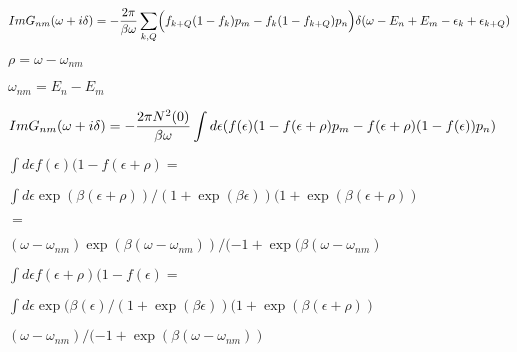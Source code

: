 \documentclass[twoside]{article}
\def\lthtmlcheckvsize{\ifdim\ht\sizebox<\vsize 
  \ifdim\wd\sizebox<\hsize\expandafter\hfill\fi \expandafter\vfill
  \else\expandafter\vss\fi}%
\begin{document}
{\newpage\clearpage
{}%
$\displaystyle Im G_{nm}(\omega+i\delta)= - {2\pi \over \beta \omega
}\sum_{k,Q}\Bigl(f_{k+Q}(1-f_{k})p_m-f_{k}(1-f_{k+Q})p_n \Bigr)
 \delta(\omega -E_n+E_m-\epsilon_{k}+\epsilon_{k+Q})
$%
\lthtmlindisplaymathZ
\lthtmlcheckvsize\clearpage}

{\newpage\clearpage
{}%
$ \rho=\omega - \omega_{nm}$%
\lthtmlindisplaymathZ
\lthtmlcheckvsize\clearpage}

{\newpage\clearpage
{}%
$\omega_{nm}=E_n-E_m$%
\lthtmlindisplaymathZ
\lthtmlcheckvsize\clearpage}

{\newpage\clearpage
{}%
$\displaystyle Im G_{nm}(\omega+i\delta)= - {2\pi N^2(0)\over \beta \omega} \int d\epsilon  
 (f(\epsilon)(1-f(\epsilon+\rho) p_m
- f(\epsilon+\rho)(1-f(\epsilon))p_n)
$%
\lthtmlindisplaymathZ
\lthtmlcheckvsize\clearpage}

{\newpage\clearpage
{}%
$\displaystyle \int d\epsilon f(\epsilon)(1-f(\epsilon+\rho)=$%
\lthtmlindisplaymathZ
\lthtmlcheckvsize\clearpage}

{\newpage\clearpage
{}%
$\textstyle \int d\epsilon
\exp(\beta(\epsilon+\rho))/
(1+\exp(\beta\epsilon))(1+\exp(\beta(\epsilon+\rho))$%
\lthtmlindisplaymathZ
\lthtmlcheckvsize\clearpage}

{\newpage\clearpage
{}%
$\displaystyle =$%
\lthtmlindisplaymathZ
\lthtmlcheckvsize\clearpage}

{\newpage\clearpage
{}%
$\textstyle (\omega-\omega_{nm})\exp(\beta(\omega-\omega_{nm}))/
(-1+\exp(\beta(\omega-\omega_{nm})$%
\lthtmlindisplaymathZ
\lthtmlcheckvsize\clearpage}

{\newpage\clearpage
{}%
$\displaystyle \int d\epsilon f(\epsilon+\rho )(1-f(\epsilon)=$%
\lthtmlindisplaymathZ
\lthtmlcheckvsize\clearpage}

{\newpage\clearpage
{}%
$\textstyle \int d\epsilon
\exp(\beta(\epsilon)/
(1+\exp(\beta\epsilon))(1+\exp(\beta(\epsilon+\rho))$%
\lthtmlindisplaymathZ
\lthtmlcheckvsize\clearpage}

{\newpage\clearpage
{}%
$\textstyle (\omega-\omega_{nm})/
(-1+\exp(\beta(\omega-\omega_{nm}))$%
\lthtmlindisplaymathZ
\lthtmlcheckvsize\clearpage}
\end{document}
